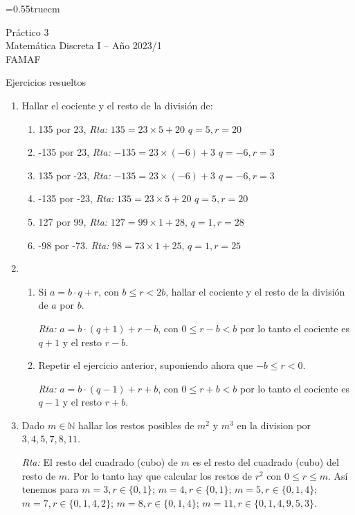 \documentclass[a4paper,12pt,twoside,spanish,reqno]{amsbook}
\numberwithin{equation}{section}
\newcommand{\rta}{\noindent\textit{Rta: }}
\begin{document}
    \baselineskip=0.55truecm %
    
    
{\bf \begin{center} Práctico 3 \\ Matemática Discreta I -- Año 2023/1 \\ FAMAF \end{center}}

{\bf \begin{center} Ejercicios resueltos \end{center}}


\begin{enumerate}

\item Hallar el cociente y el resto de la divisi\'on de:
\begin{enumerate}
\item 
135 por 23, \rta $135= 23\times 5 +20$ $q=5, r=20$
\item
-135 por 23, \rta $-135= 23\times (-6) +3$ $q=-6, r=3$
\item
135 por -23, \rta $ -135= 23\times (-6) +3$ $q=-6, r=3$
\item
-135 por -23, \rta $135= 23\times 5 +20$ $q=5, r=20$
\item
127 por 99, \rta $127=99\times1+28$, $q=1, r=28$
\item
-98 por -73. \rta $ 98=73\times 1+25$, $q=1, r=25$
\end{enumerate}


\item 
\begin{enumerate}
    \item Si $a=b\cdot q+r$, con $b \le r <2 b$, hallar el cociente y el resto de la divisi\'on de $a$ por $b$.
    
    \rta $a = b \cdot (q+1) + r-b$, con $0 \le r-b < b$ por lo tanto el cociente es $q+1$ y el resto  $r-b$.
    
    
    \item Repetir el ejercicio anterior, suponiendo ahora que $-b \le r < 0$.  
    
    \rta  $a = b \cdot (q-1) + r+b$, con $0 \le r+b < b$ por lo tanto el cociente es $q-1$ y el resto  $r+b$.
\end{enumerate}



\item Dado $m\in \mathbb N$ hallar los restos posibles de $m^2$ y $m^3$ en la division por $3,4,5,7,8, 11$.


\rta El resto del cuadrado (cubo)  de $m$ es el resto del cuadrado (cubo)  del resto de $m$.
Por lo tanto hay que calcular los restos de $r^2$ con $0\le r\le m$.
Así tenemos para $m=3, r\in\{0, 1\}$; $m=4, r\in\{0,1\}$; $m=5, r\in\{0,1,4\}$; $m=7,r\in\{0,1,4,2\}$;
$m=8, r\in\{0,1,4\}$; $m=11, r\in\{0,1,4,9,5,3\}$.




\end{enumerate}
\end{document}

